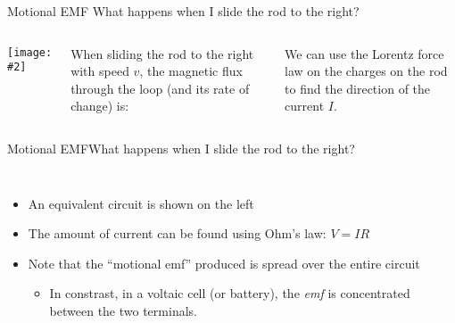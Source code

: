 \documentclass[12pt,aspectratio=169]{beamer}
\newcommand{\pic}[2]{\texttt{[image: \#2]}}
\newcommand{\eq}[2]{\vspace{#1}{\Large\begin{displaymath}#2\end{displaymath}}}
\begin{document}
%
%    
%    
%



\begin{frame}{Motional EMF}
  {What happens when I slide the rod to the right?}
  \begin{columns}
    \pic{1}{motional-emf-1.png}

    When sliding the rod to the right with speed $v$, the magnetic flux through
    the loop (and its rate of change) is:

    
    We can use the Lorentz force law on the charges on the rod to find the
    direction of the current $I$.
  \end{columns}
\end{frame}



\begin{frame}{Motional EMF}{What happens when I slide the rod to the right?}
  \begin{columns}
    
    \begin{itemize}
    \item An equivalent circuit is shown on the left
    \item The amount of current can be found using Ohm's law: $V=IR$
    \item Note that the ``motional emf'' produced is spread over the entire
      circuit
      \begin{itemize}
      \item In constrast, in a voltaic cell (or battery), the \emph{emf} is
        concentrated between the two terminals.
      \end{itemize}
    \end{itemize}
  \end{columns}
\end{frame}
\end{document}
